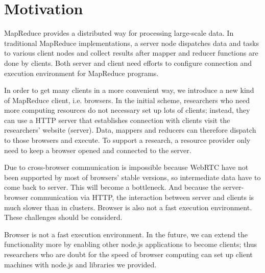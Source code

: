 \section{Motivation}

MapReduce\cite{mapreduce} provides a distributed way for processing large-scale data. In traditional MapReduce implementations, a server node dispatches data and tasks to various client nodes and collect results after mapper and reducer functions are done by clients. Both server and client need efforts to configure connection and execution environment for MapReduce programs.

In order to get many clients in a more convenient way, we introduce a new kind of MapReduce client, i.e. browsers. In the initial scheme, researchers who need more computing resources do not necessary set up lots of clients; instead, they can use a HTTP server that establishes connection with clients visit the researchers’ website (server).
Data, mappers and reducers can therefore dispatch to those browsers and execute. To support a research, a resource provider only need to keep a browser opened and connected to the server.

Due to cross-browser communication is impossible because WebRTC\cite{webRTC} have not been supported by most of browsers' stable versions, so intermediate data have to come back to server. This will become a bottleneck.
And because the server-browser communication via HTTP, the interaction between server and clients is much slower than in clusters. Browser is also not a fast execution environment. These challenges should be considerd.

Browser is not a fast execution environment. In the future, we can extend the functionality more by enabling other node.js\cite{nodejs} applications to become clients; thus researchers who are doubt for the speed of browser computing can set up client machines with node.js and libraries we provided.